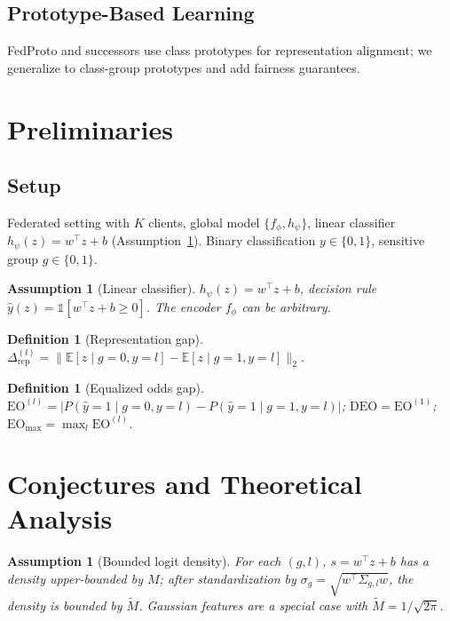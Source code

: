 \documentclass{article}
\newtheorem{definition}[theorem]{Definition}
\newtheorem{assumption}[theorem]{Assumption}
\newcommand{\E}{\mathbb{E}}
\newcommand{\indic}{\mathbb{1}}
\newcommand{\sigm}{\sigma}
\newcommand{\rep}{\Delta_{\mathrm{rep}}}
\newcommand{\wz}{w^\top z + b}
\begin{document}
\subsection{Prototype-Based Learning}
FedProto and successors use class prototypes for representation alignment;
we generalize to class-group prototypes and add fairness guarantees.

\section{Preliminaries}
\label{sec:prelim}
\subsection{Setup}
Federated setting with $K$ clients, global model $\{f_\phi, h_\psi\}$,
linear classifier $h_\psi(z) = w^\top z + b$ (Assumption~\ref{ass:linear}).
Binary classification $y \in \{0,1\}$, sensitive group $g \in \{0,1\}$.

\begin{assumption}[Linear classifier]\label{ass:linear}
$h_\psi(z) = w^\top z + b$, decision rule $\hat y(z) = \indic[\wz \geq 0]$.
The encoder $f_\phi$ can be arbitrary.
\end{assumption}

\begin{definition}[Representation gap]\label{def:rep}
$\rep^{(l)} = \| \E[z \mid g{=}0,y{=}l] - \E[z \mid g{=}1,y{=}l] \|_2$.
\end{definition}

\begin{definition}[Equalized odds gap]\label{def:eo}
$\mathrm{EO}^{(l)} = |P(\hat y{=}1 \mid g{=}0,y{=}l) - P(\hat y{=}1 \mid g{=}1,y{=}l)|$;
$\mathrm{DEO} = \mathrm{EO}^{(1)}$; $\mathrm{EO}_{\max} = \max_l \mathrm{EO}^{(l)}$.
\end{definition}


\section{Conjectures and Theoretical Analysis}
\label{sec:conj}
\begin{assumption}[Bounded logit density]\label{ass:density}
For each $(g,l)$, $s = \wz$ has a density upper-bounded by $M$; after
standardization by $\sigm_g = \sqrt{w^\top \Sigma_{g,l} w}$, the density is
bounded by $\tilde M$. Gaussian features are a special case with
$\tilde M = 1/\sqrt{2\pi}$.
\end{assumption}
\end{document}
